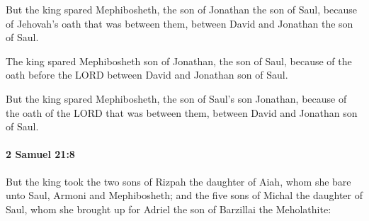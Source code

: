 			\begin{versebox}
					\item[BHS] 
					\item[ASV] But the king spared Mephibosheth, the son of Jonathan the son of Saul, because of Jehovah's oath that was between them, between David and Jonathan the son of Saul.
					\item[NIV] The king spared Mephibosheth son of Jonathan, the son of Saul, because of the oath before the LORD between David and Jonathan son of Saul.
					\item[NRSV] But the king spared Mephibosheth, the son of Saul’s son Jonathan, because of the oath of the LORD that was between them, between David and Jonathan son of Saul.
			\end{versebox}

		\paragraph{2 Samuel 21:8} %
			\label{2SAMUEL-21-8}

			But the king took the two sons of Rizpah the daughter of Aiah, whom she bare unto Saul, Armoni and Mephibosheth; and the five sons of Michal the daughter of Saul, whom she brought up for Adriel the son of Barzillai the Meholathite:

